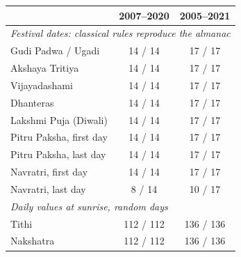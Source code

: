\begin{tabular}{lcc}
\toprule
 & 2007--2020 & 2005--2021 \\
\midrule
\multicolumn{3}{l}{\textit{Festival dates: classical rules reproduce the almanac}} \\
\quad Gudi Padwa / Ugadi & 14 / 14 & 17 / 17 \\
\quad Akshaya Tritiya & 14 / 14 & 17 / 17 \\
\quad Vijayadashami & 14 / 14 & 17 / 17 \\
\quad Dhanteras & 14 / 14 & 17 / 17 \\
\quad Lakshmi Puja (Diwali) & 14 / 14 & 17 / 17 \\
\quad Pitru Paksha, first day & 14 / 14 & 17 / 17 \\
\quad Pitru Paksha, last day & 14 / 14 & 17 / 17 \\
\quad Navratri, first day & 14 / 14 & 17 / 17 \\
\quad Navratri, last day & 8 / 14 & 10 / 17 \\
\multicolumn{3}{l}{\textit{Daily values at sunrise, random days}} \\
\quad Tithi & 112 / 112 & 136 / 136 \\
\quad Nakshatra & 112 / 112 & 136 / 136 \\
\bottomrule
\end{tabular}
